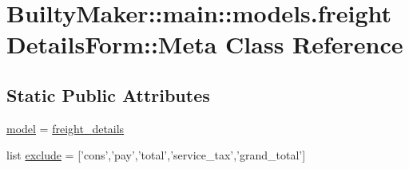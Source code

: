 \hypertarget{classBuiltyMaker_1_1main_1_1models_1_1freightDetailsForm_1_1Meta}{\section{\-Builty\-Maker\-:\-:main\-:\-:models.\-freight\-Details\-Form\-:\-:\-Meta \-Class \-Reference}
\label{classBuiltyMaker_1_1main_1_1models_1_1freightDetailsForm_1_1Meta}
}
\subsection*{\-Static \-Public \-Attributes}
\begin{DoxyCompactItemize}
\item 
\hyperlink{classBuiltyMaker_1_1main_1_1models_1_1freightDetailsForm_1_1Meta_add8f591c99f14c4747e029bebfe4a133}{model} = \hyperlink{classBuiltyMaker_1_1main_1_1models_1_1freight__details}{freight\-\_\-details}
\item 
list \hyperlink{classBuiltyMaker_1_1main_1_1models_1_1freightDetailsForm_1_1Meta_a369ceb85911512de5da05ee3524eaccd}{exclude} = \mbox{[}'cons','pay','total','service\-\_\-tax','grand\-\_\-total'\mbox{]}
\end{DoxyCompactItemize}


